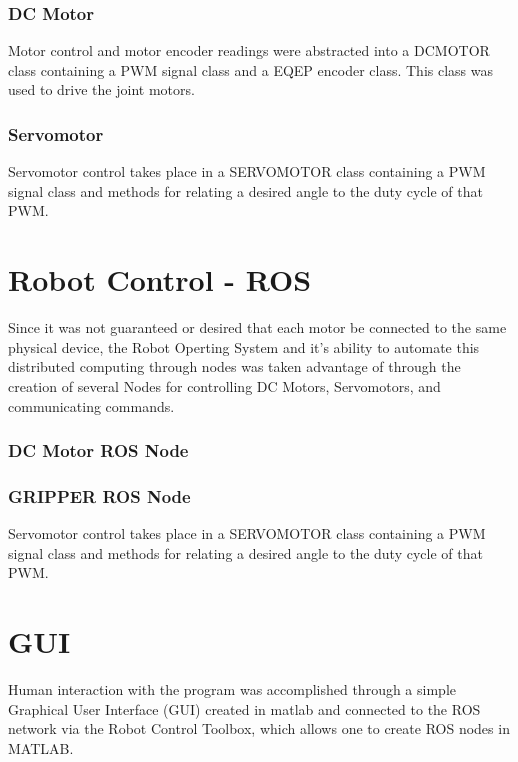\documentclass{article}
\let\Oldsection\section
\renewcommand{\section}{\FloatBarrier\Oldsection}
\let\Oldsubsubsection\subsubsection
\renewcommand{\subsubsection}{\FloatBarrier\Oldsubsubsection}
\begin{document}
\subsubsection{DC Motor}
Motor control and motor encoder readings were abstracted into a DCMOTOR class containing a PWM signal class and a EQEP encoder class. This class was used to drive the joint motors.

\clearpage

\clearpage

\subsubsection{Servomotor}
Servomotor control takes place in a SERVOMOTOR class containing a PWM signal class and methods for relating a desired angle to the duty cycle of that PWM.

\clearpage

\clearpage

\section{Robot Control - ROS}
Since it was not guaranteed or desired that each motor be connected to the same physical device, the Robot Operting System and it's ability to automate this distributed computing through nodes  was taken advantage of through the creation of several Nodes for controlling DC Motors, Servomotors, and communicating commands.
\subsubsection{DC Motor ROS Node}
 \vspace{12pt}


\subsubsection{GRIPPER ROS Node}
Servomotor control takes place in a SERVOMOTOR class containing a PWM signal class and methods for relating a desired angle to the duty cycle of that PWM.

\clearpage

\section{GUI}
Human interaction with the program was accomplished through a simple Graphical User Interface (GUI) created in matlab and connected to the ROS network via the Robot Control Toolbox, which allows one to create ROS nodes in  MATLAB.
\end{document}
